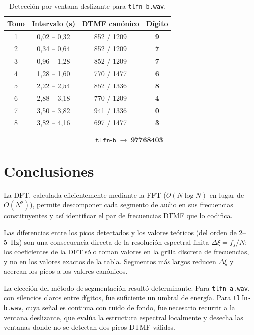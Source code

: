 \documentclass[]{report}
\begin{document}
\begin{table}[H]
\centering
\begin{tabular}{cccc}
\toprule
\textbf{Tono} & \textbf{Intervalo (s)} & \textbf{DTMF canónico} & \textbf{Dígito} \\
\midrule
1 & 0{,}02 -- 0{,}32 & 852 / 1209 & \textbf{9} \\
2 & 0{,}34 -- 0{,}64 & 852 / 1209 & \textbf{7} \\
3 & 0{,}96 -- 1{,}28 & 852 / 1209 & \textbf{7} \\
4 & 1{,}28 -- 1{,}60 & 770 / 1477 & \textbf{6} \\
5 & 2{,}22 -- 2{,}54 & 852 / 1336 & \textbf{8} \\
6 & 2{,}88 -- 3{,}18 & 770 / 1209 & \textbf{4} \\
7 & 3{,}50 -- 3{,}82 & 941 / 1336 & \textbf{0} \\
8 & 3{,}82 -- 4{,}16 & 697 / 1477 & \textbf{3} \\
\bottomrule
\end{tabular}
\caption{Detección por ventana deslizante para \texttt{tlfn-b.wav}.}
\end{table}

\[
\boxed{\texttt{tlfn-b} \;\rightarrow\; \mathbf{97768403}}
\]

\section*{Conclusiones}

La DFT, calculada eficientemente mediante la FFT ($O(N\log N)$ en lugar de $O(N^2)$),
permite descomponer cada segmento de audio en sus frecuencias constituyentes y
así identificar el par de frecuencias DTMF que lo codifica.

Las diferencias entre los picos detectados y los valores teóricos (del orden de
2--5~Hz) son una consecuencia directa de la resolución espectral finita
$\Delta\xi = f_s/N$: los coeficientes de la DFT sólo toman valores en la grilla
discreta de frecuencias, y no en los valores exactos de la tabla. Segmentos más
largos reducen $\Delta\xi$ y acercan los picos a los valores canónicos.

La elección del método de segmentación resultó determinante. Para
\texttt{tlfn-a.wav}, con silencios claros entre dígitos, fue suficiente un
umbral de energía. Para \texttt{tlfn-b.wav}, cuya señal es continua con ruido
de fondo, fue necesario recurrir a la ventana deslizante, que evalúa la
estructura espectral localmente y desecha las ventanas donde no se detectan dos
picos DTMF válidos.
\end{document}
